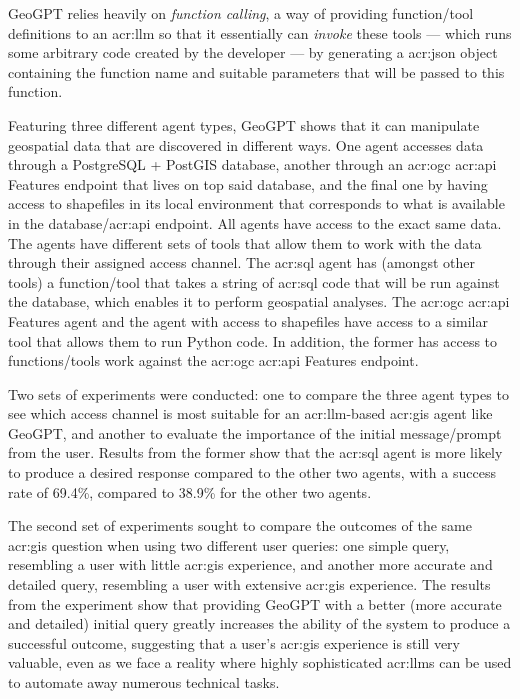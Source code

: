 GeoGPT relies heavily on \textit{function calling}, a way of providing function/tool definitions to an \acrshort{acr:llm} so that it essentially can \textit{invoke} these tools --- which runs some arbitrary code created by the developer --- by generating a \acrshort{acr:json} object containing the function name and suitable parameters that will be passed to this function.

Featuring three different agent types, GeoGPT shows that it can manipulate geospatial data that are discovered in different ways. One agent accesses data through a PostgreSQL + PostGIS database, another through an \acrshort{acr:ogc} \acrshort{acr:api} Features endpoint that lives on top said database, and the final one by having access to shapefiles in its local environment that corresponds to what is available in the database/\acrshort{acr:api} endpoint. All agents have access to the exact same data. The agents have different sets of tools that allow them to work with the data through their assigned access channel. The \acrshort{acr:sql} agent has (amongst other tools) a function/tool that takes a string of \acrshort{acr:sql} code that will be run against the database, which enables it to perform geospatial analyses. The \acrshort{acr:ogc} \acrshort{acr:api} Features agent and the agent with access to shapefiles have access to a similar tool that allows them to run Python code. In addition, the former has access to functions/tools work against the \acrshort{acr:ogc} \acrshort{acr:api} Features endpoint.

Two sets of experiments were conducted: one to compare the three agent types to see which access channel is most suitable for an \acrshort{acr:llm}-based \acrshort{acr:gis} agent like GeoGPT, and another to evaluate the importance of the initial message/prompt from the user. Results from the former show that the \acrshort{acr:sql} agent is more likely to produce a desired response compared to the other two agents, with a success rate of 69.4\%, compared to 38.9\% for the other two agents.

The second set of experiments sought to compare the outcomes of the same \acrshort{acr:gis} question when using two different user queries: one simple query, resembling a user with little \acrshort{acr:gis} experience, and another more accurate and detailed query, resembling a user with extensive \acrshort{acr:gis} experience. The results from the experiment show that providing GeoGPT with a better (more accurate and detailed) initial query greatly increases the ability of the system to produce a successful outcome, suggesting that a user's \acrshort{acr:gis} experience is still very valuable, even as we face a reality where highly sophisticated \glspl{acr:llm} can be used to automate away numerous technical tasks.

